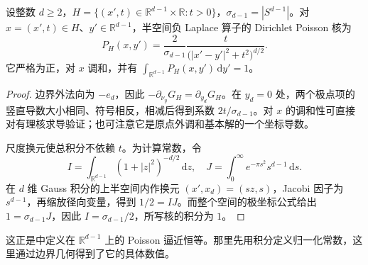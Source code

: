 \begin{proposition}\label{b2:prop:13-halfspace-poisson}
设整数 \(d\geq2\)，\(H=\{(x',t)\in\mathbb R^{d-1}\times\mathbb R:t>0\}\)，\(\sigma_{d-1}=|S^{d-1}|\)。对 \(x=(x',t)\in H\)、\(y'\in\mathbb R^{d-1}\)，半空间负 Laplace 算子的 Dirichlet Poisson 核为
\[
 P_H(x,y')=\dfrac2{\sigma_{d-1}}
       \dfrac{t}{\bigl(|x'-y'|^2+t^2\bigr)^{d/2}}.
\]
它严格为正，对 \(x\) 调和，并有 \(\int_{\mathbb R^{d-1}}P_H(x,y')\,\mathrm{d}y'=1\)。
\end{proposition}
\begin{proof}
边界外法向为 \(-e_d\)，因此 \(-\partial_{\nu_y}G_H=\partial_{y_d}G_H\)。在 \(y_d=0\) 处，两个极点项的竖直导数大小相同、符号相反，相减后得到系数 \(2t/\sigma_{d-1}\)。对 \(x\) 的调和性可直接对有理核求导验证；也可注意它是原点外调和基本解的一个坐标导数。

尺度换元使总积分不依赖 \(t\)。为计算常数，令
\[
 I=\int_{\mathbb R^{d-1}}(1+|z|^2)^{-d/2}\,\mathrm{d}z,
 \quad J=\int_0^\infty e^{-\pi s^2}s^{d-1}\,\mathrm{d}s.
\]
在 \(d\) 维 Gauss 积分的上半空间内作换元 \((x',x_d)=(sz,s)\)，Jacobi 因子为 \(s^{d-1}\)，再缩放径向变量，得到 \(1/2=IJ\)。而整个空间的极坐标公式给出 \(1=\sigma_{d-1}J\)，因此 \(I=\sigma_{d-1}/2\)，所写核的积分为 \(1\)。
\end{proof}

这正是中定义在 \(\mathbb R^{d-1}\) 上的 Poisson 逼近恒等。那里先用积分定义归一化常数，这里通过边界几何得到了它的具体数值。

